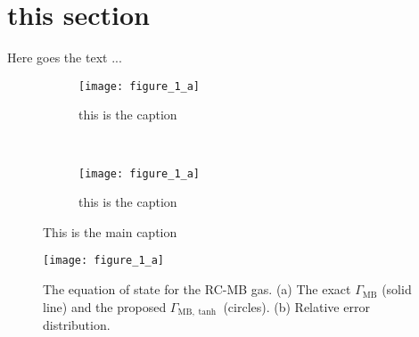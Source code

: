 \documentclass[a4paper]{article}
\begin{document}
% 
\section{this section}
%
Here goes the text ...
%
\begin{figure}[h]
	    \centering
	    \begin{subfigure}[b]{0.4\textwidth}
	        \centering
	        \texttt{[image: figure\_1\_a]}
	        \caption{ this is the caption }
	        \label{fig:figure1}
	    \end{subfigure}
	    ~
	    \begin{subfigure}[b]{0.4\textwidth}
	        \centering
	        \texttt{[image: figure\_1\_a]}
	        \caption{ this is the caption }
	        \label{fig:figure2}
	    \end{subfigure}
	    \caption{
	    This is the main caption
	    }
\end{figure}     
%
\blindtext
%
\begin{figure}[ht]
\end{figure}
%
\blindtext
\begin{landscape}
%
\clearpage
\setcounter{figure}{0}
\makeatletter 
\renewcommand{\thefigure}{\arabic{figure}}
\begin{figure}[h]
	\centering
	\texttt{[image: figure\_1\_a]}
	\caption{
	The equation of state for the RC-MB gas. (a) The exact $\Gamma_{\mathrm{MB}}$ (solid line) and the proposed $\Gamma_{\mathrm{MB},\tanh}$ (circles). (b) Relative error distribution.
	}
	\label{fig:figure_1_a}
\end{figure}
%      
\end{landscape}
%
\end{document}
